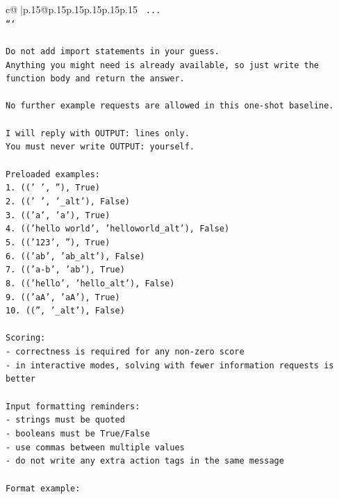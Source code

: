 \documentclass{article}
\begin{document}
{\begin{supertabular}{c@{$\;$}|p{.15\linewidth}@{}p{.15\linewidth}p{.15\linewidth}p{.15\linewidth}p{.15\linewidth}p{.15\linewidth}}
{{{\texttt{    ...} \\
\texttt{```} \\
\\ 
\texttt{Do not add import statements in your guess.} \\
\texttt{Anything you might need is already available, so just write the function body and return the answer.} \\
\\ 
\texttt{No further example requests are allowed in this one{-}shot baseline.} \\
\\ 
\texttt{I will reply with OUTPUT: lines only.} \\
\texttt{You must never write OUTPUT: yourself.} \\
\\ 
\texttt{Preloaded examples:} \\
\texttt{1. ((' ', ''), True)} \\
\texttt{2. (('   ', '\_alt'), False)} \\
\texttt{3. (('a', 'a'), True)} \\
\texttt{4. (('hello world', 'helloworld\_alt'), False)} \\
\texttt{5. (('123', ''), True)} \\
\texttt{6. (('ab', 'ab\_alt'), False)} \\
\texttt{7. (('a{-}b', 'ab'), True)} \\
\texttt{8. (('hello', 'hello\_alt'), False)} \\
\texttt{9. (('aA', 'aA'), True)} \\
\texttt{10. (('', '\_alt'), False)} \\
\\ 
\texttt{Scoring:} \\
\texttt{{-} correctness is required for any non{-}zero score} \\
\texttt{{-} in interactive modes, solving with fewer information requests is better} \\
\\ 
\texttt{Input formatting reminders:} \\
\texttt{{-} strings must be quoted} \\
\texttt{{-} booleans must be True/False} \\
\texttt{{-} use commas between multiple values} \\
\texttt{{-} do not write any extra action tags in the same message} \\
\\ 
\texttt{Format example:} \\
}}}
\end{supertabular}}
\end{document}
